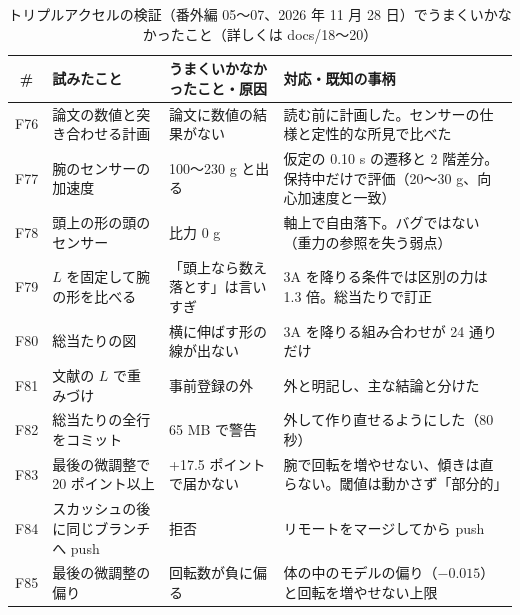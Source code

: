 \documentclass[paper=a4paper,fontsize=10pt,twocolumn,column_gap=2zw,line_length=24zw,number_of_lines=46,head_space=20mm]{jlreq}
\begin{document}
\begin{table}[t]\centering\footnotesize
\caption{トリプルアクセルの検証（番外編 05〜07、2026 年 11 月 28 日）でうまくいかなかったこと（詳しくは docs/18〜20）}\label{tab:fail6}
\setlength{\tabcolsep}{3pt}
\begin{tabular}{cp{}p{}p{}}\toprule
\# & 試みたこと & うまくいかなかったこと・原因 & 対応・既知の事柄 \\\midrule
F76 & 論文の数値と突き合わせる計画 & 論文に数値の結果がない & 読む前に計画した。センサーの仕様と定性的な所見で比べた \\
F77 & 腕のセンサーの加速度 & 100〜230 g と出る & 仮定の 0.10 s の遷移と 2 階差分。保持中だけで評価（20〜30 g、向心加速度と一致） \\
F78 & 頭上の形の頭のセンサー & 比力 0 g & 軸上で自由落下。バグではない（重力の参照を失う弱点） \\
F79 & $L$ を固定して腕の形を比べる & 「頭上なら数え落とす」は言いすぎ & 3A を降りる条件では区別の力は 1.3 倍。総当たりで訂正 \\
F80 & 総当たりの図 & 横に伸ばす形の線が出ない & 3A を降りる組み合わせが 24 通りだけ \\
F81 & 文献の $L$ で重みづけ & 事前登録の外 & 外と明記し、主な結論と分けた \\
F82 & 総当たりの全行をコミット & 65 MB で警告 & 外して作り直せるようにした（80 秒） \\
F83 & 最後の微調整で 20 ポイント以上 & +17.5 ポイントで届かない & 腕で回転を増やせない、傾きは直らない。閾値は動かさず「部分的」 \\
F84 & スカッシュの後に同じブランチへ push & 拒否 & リモートをマージしてから push \\
F85 & 最後の微調整の偏り & 回転数が負に偏る & 体の中のモデルの偏り（$-0.015$）と回転を増やせない上限 \\\bottomrule
\end{tabular}
\end{table}
\end{document}
